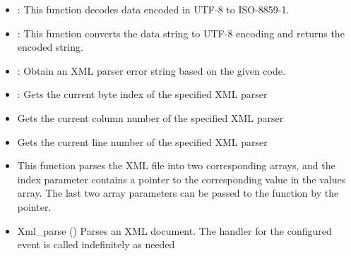 \begin{itemize}
  \item {
    : 
    This function decodes data encoded in UTF-8 to ISO-8859-1.
  }
  \item {
    :
    This function converts the data string to UTF-8 encoding and returns the encoded string.
  }
  \item {
    :
    Obtain an XML parser error string based on the given code.
  }
  \item{
    :
    Gets the current byte index of the specified XML parser
  }
  \item{
    Gets the current column number of the specified XML parser
  }
  \item{
    Gets the current line number of the specified XML parser
  }
  \item{
    This function parses the XML file into two corresponding arrays, and the index parameter contains a pointer to the corresponding value in the values array.
    The last two array parameters can be passed to the function by the pointer.
  }
  \item{
    Xml\_parse () Parses an XML document.
    The handler for the configured event is called indefinitely as needed
  }
\end{itemize}

